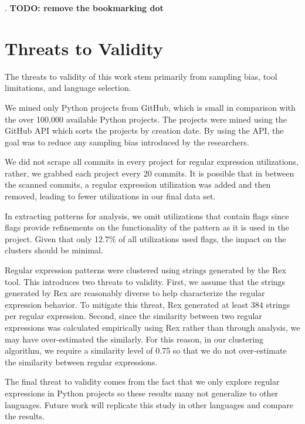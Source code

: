 \documentclass[conference]{IEEEtran}
\newcommand{\todo}[1]{\textbf{TODO: #1}} %
\begin{document}





.
\todo{remove the bookmarking dot}




\section{Threats to Validity}

The threats to validity of this work stem primarily from sampling bias, tool limitations, and language selection.

We mined only  Python projects from GitHub, which is  small in comparison with the over 100,000 available Python projects. The projects were mined using the GitHub API which sorts the projects by creation date. By using the API, the goal was to reduce any sampling bias introduced by the researchers.

We did not scrape all commits in every project for regular expression utilizations, rather, we grabbed each project every 20 commits. It is possible that in between the scanned commits, a regular expression utilization was added and then removed, leading to fewer utilizations in our final data set.

In extracting patterns for analysis, we omit utilizations that contain flags since flags provide refinements on the functionality of the pattern as it is used in the project. Given that only 12.7\% of all utilizations used flags, the impact on the clusters should be minimal.


Regular expression patterns were clustered using strings generated by the Rex tool. This introduces two threats to validity. First, we assume that the strings generated by Rex are reasonably diverse to help characterize the regular expression behavior. To mitigate this threat, Rex generated at least 384 strings per regular expression. Second, since the similarity between two regular expressions was calculated empirically using Rex rather than through analysis, we may have over-estimated the similarly. For this reason, in our clustering algorithm, we require a similarity level of 0.75 so that we do not over-estimate the similarity between regular  expressions.

The final threat to validity comes from the fact that we only explore regular expressions in Python projects so these results many not generalize to other languages. Future work will replicate this study in other languages and compare the results.
\end{document}
